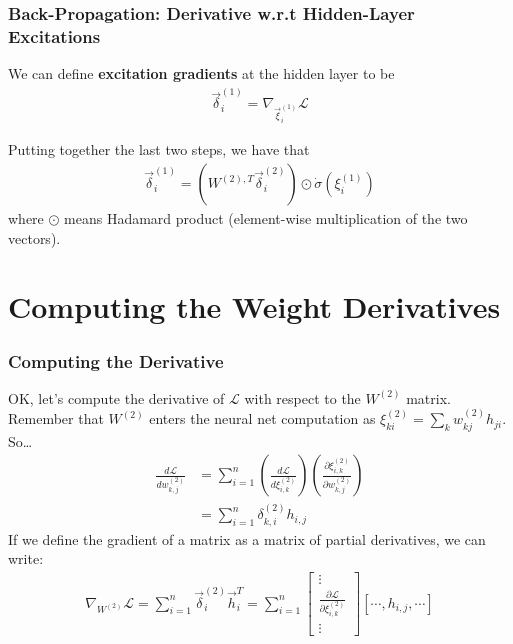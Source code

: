 \documentclass{beamer}
\begin{document}
\begin{frame}
  \frametitle{Back-Propagation: Derivative w.r.t Hidden-Layer Excitations}

  We can define {\bf excitation gradients} at  the hidden layer to be
  \begin{align*}
    \vec\delta_i^{(1)} = \nabla_{\vec\xi_i^{(1)}}{\mathcal L}
  \end{align*}

  Putting together the last two steps, we have that
  \begin{align*}
    \vec\delta_i^{(1)} = \left(W^{(2),T}\vec\delta_i^{(2)}\right) \odot
    \dot\sigma\left(\xi_i^{(1)}\right)
  \end{align*}
  where $\odot$ means Hadamard product (element-wise multiplication of the two vectors).
\end{frame}

\section[Derivatives]{Computing the Weight Derivatives}
\setcounter{subsection}{1}


\begin{frame}
  \frametitle{Computing the Derivative}
  OK, let's compute the derivative of ${\mathcal L}$ with respect to the $W^{(2)}$
  matrix.  Remember that $W^{(2)}$ enters the neural net computation as
  $\xi_{ki}^{(2)}=\sum_k w_{kj}^{(2)}h_{ji}$.  So\ldots
  \begin{align*}
    \frac{d{\mathcal L}}{dw_{k,j}^{(2)}} &=
    \sum_{i=1}^n
    \left(\frac{d{\mathcal L}}{d\xi_{i,k}^{(2)}}\right)
    \left(\frac{\partial \xi_{i,k}^{(2)}}{\partial w_{k,j}^{(2)}}\right)\\
    &= \sum_{i=1}^n \delta^{(2)}_{k,i}h_{i,j}
  \end{align*}
  If we define the gradient of a matrix as a matrix of partial
  derivatives, we can write:
  \begin{align*}
    \nabla_{W^{(2)}}{\mathcal L} = \sum_{i=1}^n \vec\delta_i^{(2)}\vec{h}_i^T
    = \sum_{i=1}^n
    \left[\begin{array}{c}\vdots\\\frac{\partial\mathcal L}{\partial\xi_{i,k}^{(2)}}\\\vdots
      \end{array}\right]
    \left[\cdots, h_{i,j}, \cdots\right]
  \end{align*}
\end{frame}
\end{document}
